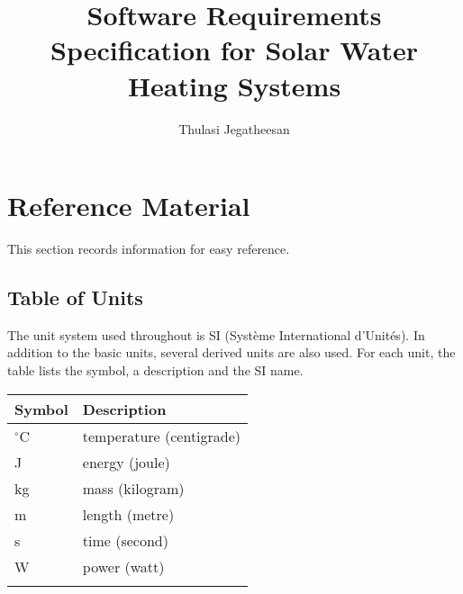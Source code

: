 \documentclass[12pt]{article}
\title{Software Requirements Specification for Solar Water Heating Systems}
\author{Thulasi Jegatheesan}
\begin{document}
\maketitle
\tableofcontents
\newpage
\section{Reference Material}
\label{Sec:RefMat}
This section records information for easy reference.
\subsection{Table of Units}
\label{Sec:ToU}
The unit system used throughout is SI (Système International d'Unités). In addition to the basic units, several derived units are also used. For each unit, the table lists the symbol, a description and the SI name.
\begin{longtable*}{l l}
\toprule
Symbol & Description
\\
\midrule
${}^{\circ}$C & temperature (centigrade)
\\
J & energy (joule)
\\
kg & mass (kilogram)
\\
m & length (metre)
\\
s & time (second)
\\
W & power (watt)
\\
\bottomrule
\label{Table:ToU}
\end{longtable*}
\end{document}
